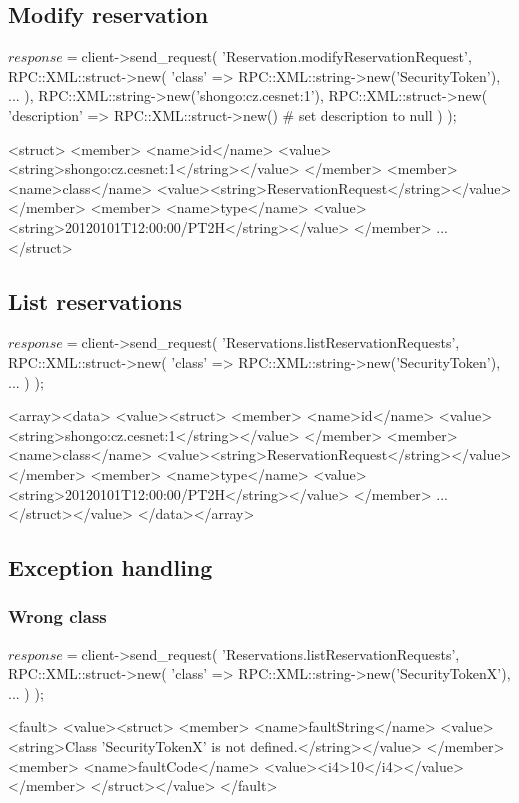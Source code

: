 \newpage
\subsection{Modify reservation}
\begin{PerlCmd}
$response = $client->send_request(
    'Reservation.modifyReservationRequest',
    RPC::XML::struct->new(
        'class' => RPC::XML::string->new('SecurityToken'),
        ...
    ),
    RPC::XML::string->new('shongo:cz.cesnet:1'),
    RPC::XML::struct->new(
        'description' => RPC::XML::struct->new() # set description to null
    )
);
\end{PerlCmd}
\begin{PerlResponse}
<struct>
  <member>
    <name>id</name>
    <value><string>shongo:cz.cesnet:1</string></value>
  </member>
  <member>
    <name>class</name>
    <value><string>ReservationRequest</string></value>
  </member>
  <member>
    <name>type</name>
    <value><string>20120101T12:00:00/PT2H</string></value>    
  </member>
  ...
</struct>
\end{PerlResponse}

\newpage
\subsection{List reservations}
\begin{PerlCmd}
$response = $client->send_request(
    'Reservations.listReservationRequests',
    RPC::XML::struct->new(
        'class' => RPC::XML::string->new('SecurityToken'),
        ...
    )
);
\end{PerlCmd}
\begin{PerlResponse}
<array><data>
  <value><struct>
    <member>
      <name>id</name>
      <value><string>shongo:cz.cesnet:1</string></value>
    </member>
    <member>
      <name>class</name>
      <value><string>ReservationRequest</string></value>
    </member>
    <member>
      <name>type</name>
      <value><string>20120101T12:00:00/PT2H</string></value>    
    </member>
    ...
  </struct></value>
</data></array>
\end{PerlResponse}

\newpage
\subsection{Exception handling}
\subsubsection{Wrong class}
\begin{PerlCmd}
$response = $client->send_request(
    'Reservations.listReservationRequests',
    RPC::XML::struct->new(
        'class' => RPC::XML::string->new('SecurityTokenX'),
        ...
    )
);
\end{PerlCmd}
\begin{PerlResponse}
<fault>
  <value><struct>
    <member>
      <name>faultString</name>
      <value><string>Class 'SecurityTokenX' is not defined.</string></value>
    </member>
    <member>
      <name>faultCode</name>
      <value><i4>10</i4></value>
    </member>
  </struct></value>
</fault>
\end{PerlResponse}

